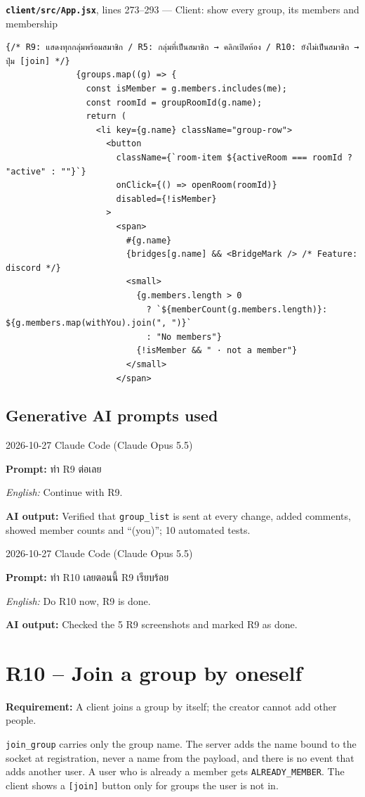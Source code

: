 \documentclass[11pt,a4paper]{article}
\newcommand{\code}[1]{\texttt{#1}}
\newcommand{\req}[1]{\begin{tcolorbox}[colback=accent!6,colframe=accent!60,boxrule=0.5pt,left=4pt,right=4pt,top=2pt,bottom=2pt]\textbf{Requirement:} #1\end{tcolorbox}}
\newcommand{\snap}[3]{\par\medskip\textbf{\code{#1}}, lines #2 --- #3}
\newcommand{\promptbox}[4]{%
\begin{tcolorbox}[colback=codebg,colframe=gray!50,boxrule=0.4pt,left=4pt,right=4pt,top=2pt,bottom=2pt]
{\small #1 \quad Claude Code (Claude Opus 5.5)}\par
\textbf{Prompt:} #2\par
\textit{English:} #3\par
\textbf{AI output:} #4
\end{tcolorbox}}
\begin{document}
\snap{client/src/App.jsx}{273--293}{Client: show every group, its members and membership}
\begin{Verbatim}[firstnumber=273]
              {/* R9: แสดงทุกกลุ่มพร้อมสมาชิก / R5: กลุ่มที่เป็นสมาชิก → คลิกเปิดห้อง / R10: ยังไม่เป็นสมาชิก → ปุ่ม [join] */}
              {groups.map((g) => {
                const isMember = g.members.includes(me);
                const roomId = groupRoomId(g.name);
                return (
                  <li key={g.name} className="group-row">
                    <button
                      className={`room-item ${activeRoom === roomId ? "active" : ""}`}
                      onClick={() => openRoom(roomId)}
                      disabled={!isMember}
                    >
                      <span>
                        #{g.name}
                        {bridges[g.name] && <BridgeMark /> /* Feature: discord */}
                        <small>
                          {g.members.length > 0
                            ? `${memberCount(g.members.length)}: ${g.members.map(withYou).join(", ")}`
                            : "No members"}
                          {!isMember && " · not a member"}
                        </small>
                      </span>
\end{Verbatim}

\subsection*{Generative AI prompts used}
\promptbox{2026-10-27}{ทำ R9 ต่อเลย}{Continue with R9.}{Verified that \code{group\_list} is sent at every change, added comments, showed member counts and “(you)”; 10 automated tests.}
\promptbox{2026-10-27}{ทำ R10 เลยตอนนี้ R9 เรียบร้อย}{Do R10 now, R9 is done.}{Checked the 5 R9 screenshots and marked R9 as done.}

\clearpage
\section{R10 -- Join a group by oneself}
\req{A client joins a group by itself; the creator cannot add other people.}

\code{join\_group} carries only the group name. The server adds the name bound to
the socket at registration, never a name from the payload, and there is no event that adds another
user. A user who is already a member gets \code{ALREADY\_MEMBER}. The client shows a
\code{[join]} button only for groups the user is not in.
\end{document}
